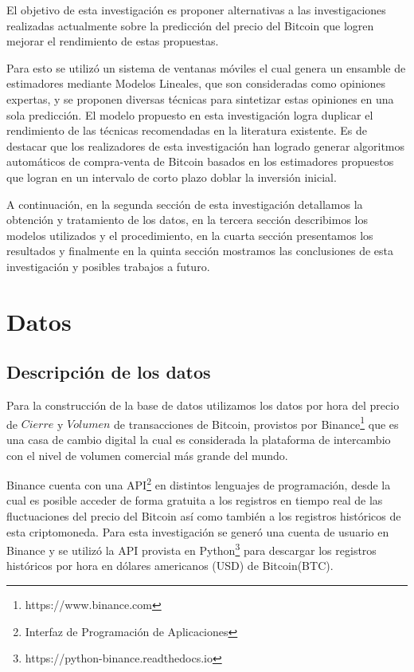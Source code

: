 \documentclass[a4paper,12pt,twocolumn]{article}
\begin{document}
El objetivo de esta investigación es proponer alternativas a las investigaciones realizadas actualmente sobre la predicción del precio del Bitcoin que logren mejorar el rendimiento de estas propuestas. 

Para esto se utilizó un sistema de ventanas móviles el cual genera un ensamble de estimadores mediante Modelos Lineales, que son consideradas como opiniones expertas, y se proponen diversas técnicas para sintetizar estas opiniones en una sola predicción. El modelo propuesto en esta investigación logra duplicar el rendimiento de las técnicas recomendadas en la literatura existente. Es de destacar que los realizadores de esta investigación han logrado generar algoritmos automáticos de compra-venta de Bitcoin  basados en los estimadores propuestos que logran en un  intervalo de corto plazo doblar la inversión inicial.  


A continuación, en la segunda sección de esta investigación detallamos la obtención y tratamiento de los datos, en la tercera sección describimos los modelos utilizados y el procedimiento, en la cuarta sección presentamos los resultados y finalmente en la quinta sección mostramos las conclusiones de esta investigación y posibles trabajos a futuro.



\section{Datos}
\subsection{Descripción de los datos}

Para la construcción de la base de datos utilizamos los datos por hora del precio de  $Cierre$ y $Volumen$ de transacciones de Bitcoin, provistos por Binance\footnote{https://www.binance.com} que es una casa de cambio digital la cual es considerada la plataforma de intercambio con el nivel de volumen comercial más grande del mundo. 

Binance cuenta con una API\footnote{Interfaz de Programación de Aplicaciones} en distintos lenguajes de programación, desde la cual es posible acceder de forma gratuita a los registros en tiempo real de las fluctuaciones del precio del Bitcoin así como también a los registros históricos de esta criptomoneda. Para esta investigación se generó una cuenta de usuario en Binance y se utilizó la API provista en Python\footnote{https://python-binance.readthedocs.io} para descargar los registros históricos por hora en dólares americanos (USD) de Bitcoin(BTC). 
\end{document}
